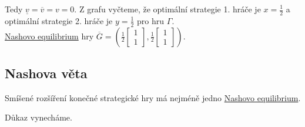 Tedy $\underline{v} = \overline{v} = v = 0$. Z grafu vyčteme, že optimální strategie 1. hráče je $x=\frac{1}{2}$ a 
optimální strategie 2. hráče je $y = \frac{1}{2}$ pro hru $\Gamma$.\\
\hyperref[nash]{Nashovo equilibrium} hry $\overline{G} = 
\left(\frac{1}{2}\begin{bmatrix}1 \\ 1\end{bmatrix}, \frac{1}{2}\begin{bmatrix}1 \\ 1\end{bmatrix}\right)$.

\subsection{Nashova věta}\label{nashV}
Smíšené rozšíření konečné strategické hry má nejméně jedno \hyperref[nash]{Nashovo equilibrium}.

Důkaz vynecháme.